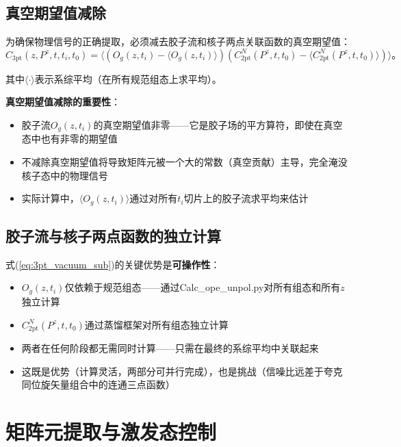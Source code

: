 \documentclass[12pt,a4paper]{ctexart}
\theoremstyle{definition}
\begin{document}
\subsection{真空期望值减除}

为确保物理信号的正确提取，必须减去胶子流和核子两点关联函数的真空期望值\cite{NoteGluonPDFs,Chen2025gluon}：
\begin{equation}
\boxed{C_{3\text{pt}}(z, P^z, t, t_i, t_0) = \langle (O_g(z, t_i) - \langle O_g(z, t_i) \rangle)(C^N_{2\text{pt}}(P^z, t, t_0) - \langle C^N_{2\text{pt}}(P^z, t, t_0) \rangle) \rangle}。
\label{eq:3pt_vacuum_sub}
\end{equation}

其中$\langle\cdot\rangle$表示系综平均（在所有规范组态上求平均）。

\textbf{真空期望值减除的重要性}\cite{Chen2025gluon}：
\begin{itemize}
    \item 胶子流$O_g(z,t_i)$的真空期望值非零——它是胶子场的平方算符，即使在真空态中也有非零的期望值
    \item 不减除真空期望值将导致矩阵元被一个大的常数（真空贡献）主导，完全淹没核子态中的物理信号
    \item 实际计算中，$\langle O_g(z,t_i)\rangle$通过对所有$t_i$切片上的胶子流求平均来估计
\end{itemize}

\subsection{胶子流与核子两点函数的独立计算}

式(\ref{eq:3pt_vacuum_sub})的关键优势是\textbf{可操作性}\cite{NoteGluonPDFs}：
\begin{itemize}
    \item $O_g(z,t_i)$仅依赖于规范组态——通过Calc\_ope\_unpol.py对所有组态和所有$z$独立计算
    \item $C^N_{2\text{pt}}(P^z,t,t_0)$通过蒸馏框架对所有组态独立计算
    \item 两者在任何阶段都无需同时计算——只需在最终的系综平均中关联起来
    \item 这既是优势（计算灵活，两部分可并行完成），也是挑战（信噪比远差于夸克同位旋矢量组合中的连通三点函数）
\end{itemize}

\section{矩阵元提取与激发态控制}
\end{document}
